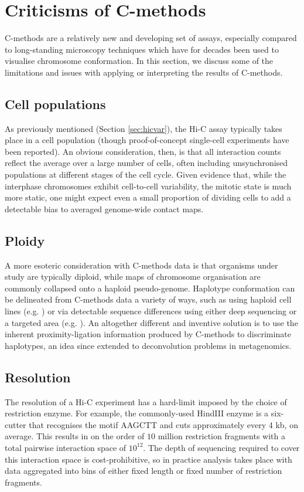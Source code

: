 \documentclass[a4paper,11pt,oneside]{book}
\begin{document}
\section{Criticisms of C-methods}

C-methods are a relatively new and developing set of assays, especially compared to long-standing microscopy techniques which have for decades been used to visualise chromosome conformation. In this section, we discuss some of the limitations and issues with applying or interpreting the results of C-methods.

\subsection{Cell populations}
As previously mentioned (Section \ref{sec:hicvar}), the Hi-C assay typically takes place in a cell population (though proof-of-concept single-cell experiments have been reported\cite{Nagano2013}). An obvious consideration, then, is that all interaction counts reflect the average over a large number of cells, often including unsynchronised populations at different stages of the cell cycle.\cite{Fraser2015} Given evidence that, while the interphase chromosomes exhibit cell-to-cell variability, the mitotic state is much more static,\cite{Naumova2013, Dekker2014} one might expect even a small proportion of dividing cells to add a detectable bias to averaged genome-wide contact maps.

\subsection{Ploidy}
A more esoteric consideration with C-methods data is that organisms under study are typically diploid, while maps of chromosome organisation are commonly collapsed onto a haploid pseudo-genome. Haplotype conformation can be delineated from C-methods data a variety of ways, such as using haploid cell lines (e.g. ) or via detectable sequence differences using either deep sequencing or a targeted area (e.g. ). An altogether different and inventive solution is to use the inherent proximity-ligation information produced by C-methods to discriminate haplotypes,\cite{Selvaraj2013a} an idea since extended to deconvolution problems in metagenomics.\cite{Burton2014, Beitel2014}

\subsection{Resolution}
The resolution of a Hi-C experiment has a hard-limit imposed by the choice of restriction enzyme. For example, the commonly-used HindIII enzyme is a six-cutter that recognises the motif AAGCTT and cuts approximately every 4 kb, on average.\cite{DeWit2012} This results in on the order of $10$ million restriction fragments with a total pairwise interaction space of $10^{12}$.\cite{Lajoie2014} The depth of sequencing required to cover this interaction space is cost-prohibitive, so in practice analysis takes place with data aggregated into bins of either fixed length or fixed number of restriction fragments. 
\end{document}
